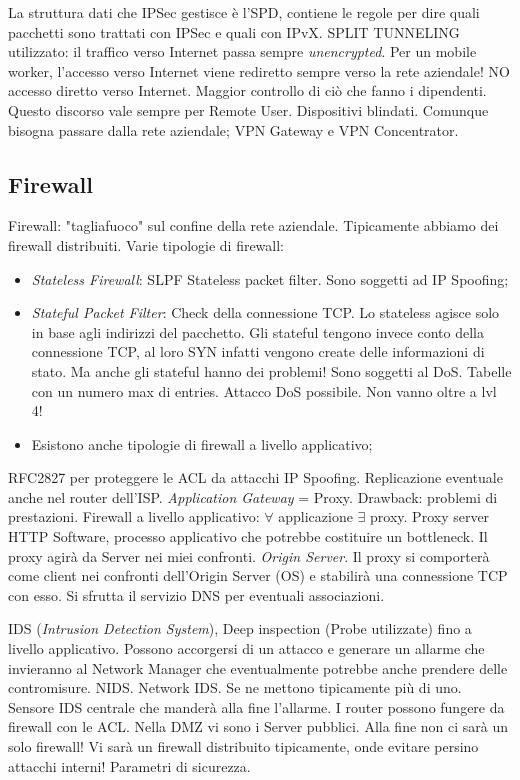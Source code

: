 La struttura dati che IPSec gestisce è l'SPD, contiene le regole per dire quali pacchetti sono trattati con IPSec e quali con IPvX. SPLIT TUNNELING utilizzato: il traffico verso Internet passa sempre \textit{unencrypted}. Per un mobile worker, l'accesso verso Internet viene rediretto sempre verso la rete aziendale! NO accesso diretto verso Internet. Maggior controllo di ciò che fanno i dipendenti. Questo discorso vale sempre per Remote User. Dispositivi blindati. Comunque bisogna passare dalla rete aziendale; VPN Gateway e VPN Concentrator.

\subsection{Firewall}

Firewall: "tagliafuoco" sul confine della rete aziendale. Tipicamente abbiamo dei firewall distribuiti. Varie tipologie di firewall:

\begin{itemize}

\item{\textit{Stateless Firewall}}: SLPF Stateless packet filter. Sono soggetti ad IP Spoofing;
\item{\textit{Stateful Packet Filter}}: Check della connessione TCP. Lo stateless agisce solo in base agli indirizzi del pacchetto. Gli stateful tengono invece conto della connessione TCP, al loro SYN infatti vengono create delle informazioni di stato. Ma anche gli stateful hanno dei problemi! Sono soggetti al DoS. Tabelle con un numero max di entries. Attacco DoS possibile. Non vanno oltre a lvl 4!
\item Esistono anche tipologie di firewall a livello applicativo;

\end{itemize}

RFC2827 per proteggere le ACL da attacchi IP Spoofing. Replicazione eventuale anche nel router dell'ISP. \textit{Application Gateway} = Proxy. Drawback: problemi di prestazioni. Firewall a livello applicativo: $\forall$ applicazione $\exists$ proxy. Proxy server HTTP Software, processo applicativo che potrebbe costituire un bottleneck. Il proxy agirà da Server nei miei confronti. \textit{Origin Server}. Il proxy si comporterà come client nei confronti dell'Origin Server (OS) e stabilirà una connessione TCP con esso. Si sfrutta il servizio DNS per eventuali associazioni.

IDS (\textit{Intrusion Detection System}), Deep inspection (Probe utilizzate) fino a livello applicativo. Possono accorgersi di un attacco e generare un allarme che invieranno al Network Manager che eventualmente potrebbe anche prendere delle contromisure. NIDS. Network IDS. Se ne mettono tipicamente più di uno. Sensore IDS centrale che manderà alla fine l'allarme.
I router possono fungere da firewall con le ACL. Nella DMZ vi sono i Server pubblici. Alla fine non ci sarà un solo firewall! Vi sarà un firewall distribuito tipicamente, onde evitare persino attacchi interni! Parametri di sicurezza.

